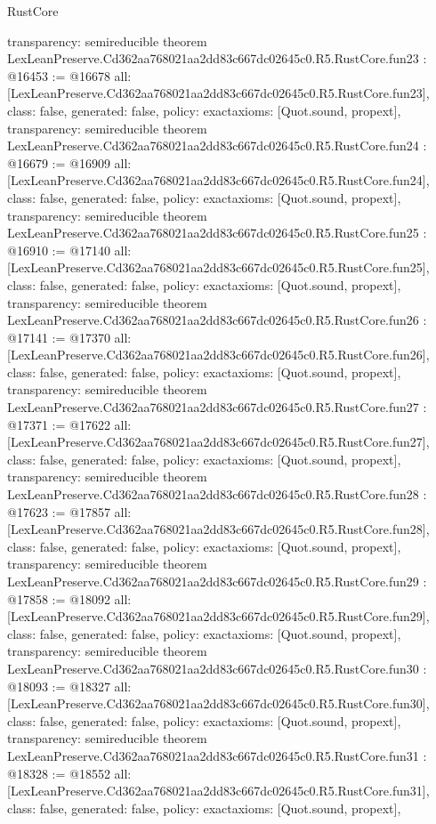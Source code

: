 \begin{lexlean}{RustCore}
\begin{coremodule}
{  transparency: semireducible
}
theorem LexLeanPreserve.Cd362aa768021aa2dd83c667dc02645c0.R5.RustCore.fun23 : @16453 := @16678 {
  all: [LexLeanPreserve.Cd362aa768021aa2dd83c667dc02645c0.R5.RustCore.fun23],
  class: false,
  generated: false,
  policy: exact{axioms: [Quot.sound, propext]},
  transparency: semireducible
}
theorem LexLeanPreserve.Cd362aa768021aa2dd83c667dc02645c0.R5.RustCore.fun24 : @16679 := @16909 {
  all: [LexLeanPreserve.Cd362aa768021aa2dd83c667dc02645c0.R5.RustCore.fun24],
  class: false,
  generated: false,
  policy: exact{axioms: [Quot.sound, propext]},
  transparency: semireducible
}
theorem LexLeanPreserve.Cd362aa768021aa2dd83c667dc02645c0.R5.RustCore.fun25 : @16910 := @17140 {
  all: [LexLeanPreserve.Cd362aa768021aa2dd83c667dc02645c0.R5.RustCore.fun25],
  class: false,
  generated: false,
  policy: exact{axioms: [Quot.sound, propext]},
  transparency: semireducible
}
theorem LexLeanPreserve.Cd362aa768021aa2dd83c667dc02645c0.R5.RustCore.fun26 : @17141 := @17370 {
  all: [LexLeanPreserve.Cd362aa768021aa2dd83c667dc02645c0.R5.RustCore.fun26],
  class: false,
  generated: false,
  policy: exact{axioms: [Quot.sound, propext]},
  transparency: semireducible
}
theorem LexLeanPreserve.Cd362aa768021aa2dd83c667dc02645c0.R5.RustCore.fun27 : @17371 := @17622 {
  all: [LexLeanPreserve.Cd362aa768021aa2dd83c667dc02645c0.R5.RustCore.fun27],
  class: false,
  generated: false,
  policy: exact{axioms: [Quot.sound, propext]},
  transparency: semireducible
}
theorem LexLeanPreserve.Cd362aa768021aa2dd83c667dc02645c0.R5.RustCore.fun28 : @17623 := @17857 {
  all: [LexLeanPreserve.Cd362aa768021aa2dd83c667dc02645c0.R5.RustCore.fun28],
  class: false,
  generated: false,
  policy: exact{axioms: [Quot.sound, propext]},
  transparency: semireducible
}
theorem LexLeanPreserve.Cd362aa768021aa2dd83c667dc02645c0.R5.RustCore.fun29 : @17858 := @18092 {
  all: [LexLeanPreserve.Cd362aa768021aa2dd83c667dc02645c0.R5.RustCore.fun29],
  class: false,
  generated: false,
  policy: exact{axioms: [Quot.sound, propext]},
  transparency: semireducible
}
theorem LexLeanPreserve.Cd362aa768021aa2dd83c667dc02645c0.R5.RustCore.fun30 : @18093 := @18327 {
  all: [LexLeanPreserve.Cd362aa768021aa2dd83c667dc02645c0.R5.RustCore.fun30],
  class: false,
  generated: false,
  policy: exact{axioms: [Quot.sound, propext]},
  transparency: semireducible
}
theorem LexLeanPreserve.Cd362aa768021aa2dd83c667dc02645c0.R5.RustCore.fun31 : @18328 := @18552 {
  all: [LexLeanPreserve.Cd362aa768021aa2dd83c667dc02645c0.R5.RustCore.fun31],
  class: false,
  generated: false,
  policy: exact{axioms: [Quot.sound, propext]},
}
\end{coremodule}
\end{lexlean}
